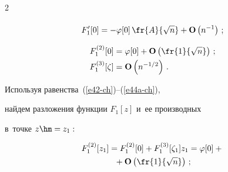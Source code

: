 \begin{multicols}{2}
\begin{multline}
 \label{e42-ch}


\end{multline}





\vspace*{-12pt}





\noindent


\begin{equation}


F_1'[0]= -\varphi[0]\,\fr{A}{\sqrt{n}}+\mathbf{O}\left(n^{-1}\right)\,;\label{e43-ch}


\end{equation}


\begin{align}


F_1^{(2)}[0]&=\varphi[0]+\mathbf{O}\left(\fr{1}{\sqrt{n}}\right)\,; \label{e44-ch}\\


  F_1^{(3)}[\zeta]&=\mathbf{O}\left(n^{-1/2}\right)\,.


 \label{e44a-ch}


 \end{align}





 Используя равенства~(\ref{e42-ch})--(\ref{e44a-ch}), 


 найдем разложения функции $F_1[z]$ и~ее производных


 в~точке $z\hm=z_{1}:$


  \begin{multline}


 F_1^{(2)}[z_{1}]= F_1^{(2)}[0]+F_1^{(3)}[\zeta_1] z_{1}


 =\varphi[0]+{}\\


 {}+\mathbf{O}\left(\fr{1}{\sqrt{n}}\right)\,;


 \label{e45-ch}


 \end{multline}


 


 \vspace*{-12pt}


 


 \noindent


 \begin{multline}



\end{multline}
\end{multicols}
